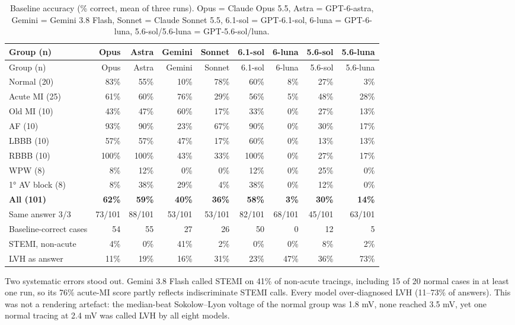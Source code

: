 \begin{longtable}[]{@{}lrrrrrrrr@{}}
\caption{Baseline accuracy (\% correct, mean of three runs). Opus = Claude Opus 5.5, Astra = GPT-6-astra, Gemini = Gemini 3.8 Flash, Sonnet = Claude Sonnet 5.5, 6.1-sol = GPT-6.1-sol, 6-luna = GPT-6-luna, 5.6-sol/5.6-luna = GPT-5.6-sol/luna.}\tabularnewline
\toprule\noalign{}
Group (n) & Opus & Astra & Gemini & Sonnet & 6.1-sol & 6-luna & 5.6-sol & 5.6-luna \\
\midrule\noalign{}
\endfirsthead
\toprule\noalign{}
Group (n) & Opus & Astra & Gemini & Sonnet & 6.1-sol & 6-luna & 5.6-sol & 5.6-luna \\
\midrule\noalign{}
\endhead
\bottomrule\noalign{}
\endlastfoot
Normal (20) & 83\% & 55\% & 10\% & 78\% & 60\% & 8\% & 27\% & 3\% \\
Acute MI (25) & 61\% & 60\% & 76\% & 29\% & 56\% & 5\% & 48\% & 28\% \\
Old MI (10) & 43\% & 47\% & 60\% & 17\% & 33\% & 0\% & 27\% & 13\% \\
AF (10) & 93\% & 90\% & 23\% & 67\% & 90\% & 0\% & 30\% & 17\% \\
LBBB (10) & 57\% & 57\% & 47\% & 17\% & 60\% & 0\% & 13\% & 13\% \\
RBBB (10) & 100\% & 100\% & 43\% & 33\% & 100\% & 0\% & 27\% & 17\% \\
WPW (8) & 8\% & 12\% & 0\% & 0\% & 12\% & 0\% & 25\% & 0\% \\
1° AV block (8) & 8\% & 38\% & 29\% & 4\% & 38\% & 0\% & 12\% & 0\% \\
\textbf{All (101)} & \textbf{62\%} & \textbf{59\%} & \textbf{40\%} & \textbf{36\%} & \textbf{58\%} & \textbf{3\%} & \textbf{30\%} & \textbf{14\%} \\
Same answer 3/3 & 73/101 & 88/101 & 53/101 & 53/101 & 82/101 & 68/101 & 45/101 & 63/101 \\
Baseline-correct cases & 54 & 55 & 27 & 26 & 50 & 0 & 12 & 5 \\
STEMI, non-acute & 4\% & 0\% & 41\% & 2\% & 0\% & 0\% & 8\% & 2\% \\
LVH as answer & 11\% & 19\% & 16\% & 31\% & 23\% & 47\% & 36\% & 73\% \\
\end{longtable}

Two systematic errors stood out. Gemini 3.8 Flash called STEMI on 41\% of non-acute tracings, including 15 of 20 normal cases in at least one run, so its 76\% acute-MI score partly reflects indiscriminate STEMI calls. Every model over-diagnosed LVH (11--73\% of answers). This was not a rendering artefact: the median-beat Sokolow--Lyon voltage of the normal group was 1.8 mV, none reached 3.5 mV, yet one normal tracing at 2.4 mV was called LVH by all eight models.


